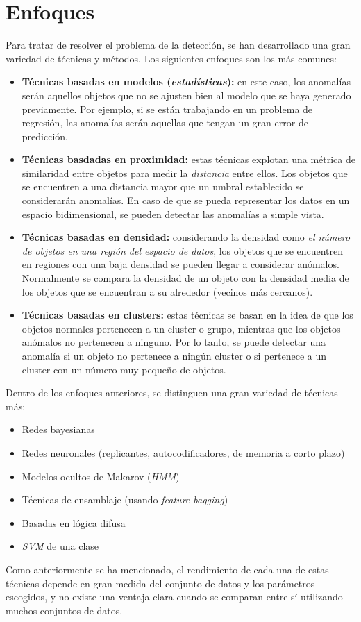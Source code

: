 \section{Enfoques}
Para tratar de resolver el problema de la detección, se han desarrollado una gran variedad de
técnicas y métodos. Los siguientes enfoques son los más comunes:
\begin{itemize}[topsep=0pt]
	\item \textbf{Técnicas basadas en modelos (\textit{estadísticas}):} en este caso, los anomalías serán aquellos objetos
		que no se ajusten bien al modelo que se haya generado previamente. Por ejemplo, si se
		están trabajando en un problema de regresión, las anomalías serán aquellas que tengan un
		gran error de predicción.
	\item \textbf{Técnicas basdadas en proximidad:} estas técnicas explotan una métrica de
		similaridad entre objetos para medir la \textit{distancia} entre ellos. Los objetos que
		se encuentren a una distancia mayor que un umbral establecido se considerarán anomalías.
		En caso de que se pueda representar los datos en un espacio bidimensional, se pueden
		detectar las anomalías a simple vista.
	\item \textbf{Técnicas basadas en densidad:} considerando la densidad como \emph{el número de
		objetos en una región del espacio de datos}, los objetos que se encuentren en regiones
		con una baja densidad se pueden llegar a considerar anómalos. Normalmente se compara la
		densidad de un objeto con la densidad media de los objetos que se encuentran a su alrededor
		(vecinos más cercanos).
	\item \textbf{Técnicas basadas en clusters:} estas técnicas se basan en la idea de que los
		objetos normales pertenecen a un cluster o grupo, mientras que los objetos anómalos no
		pertenecen a ninguno. Por lo tanto, se puede detectar una anomalía si un objeto no pertenece
		a ningún cluster o si pertenece a un cluster con un número muy pequeño de objetos.
\end{itemize}

Dentro de los enfoques anteriores, se distinguen una gran variedad de técnicas más:
\begin{itemize}[noitemsep,topsep=0pt]
	\item Redes bayesianas
	\item Redes neuronales (replicantes, autocodificadores, de memoria a corto plazo)
	\item Modelos ocultos de Makarov (\textit{HMM})
	\item Técnicas de ensamblaje (usando \textit{feature bagging})
	\item Basadas en lógica difusa
	\item \textit{SVM} de una clase
\end{itemize}

Como anteriormente se ha mencionado, el rendimiento de cada una de estas técnicas depende
en gran medida del conjunto de datos y los parámetros escogidos, y no existe una ventaja
clara cuando se comparan entre sí utilizando muchos conjuntos de datos.~\cite{chandola2009anomaly}
